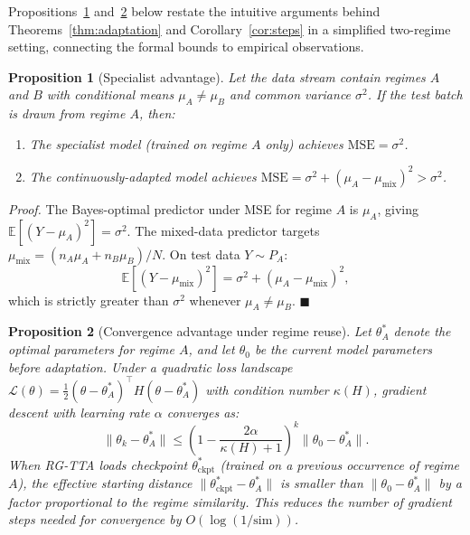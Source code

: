 \documentclass[journal]{IEEEtran}
\newtheorem{proposition}{Proposition}
\renewenvironment{proof}[1][Proof]{\noindent\textit{#1.}\space}{\hfill$\blacksquare$\par\medskip}
\begin{document}
Propositions~\ref{prop:specialist} and~\ref{prop:convergence} below restate the intuitive arguments behind Theorems~\ref{thm:adaptation} and Corollary~\ref{cor:steps} in a simplified two-regime setting, connecting the formal bounds to empirical observations.

\begin{proposition}[Specialist advantage]
\label{prop:specialist}
Let the data stream contain regimes $A$ and $B$ with conditional means $\mu_A \neq \mu_B$ and common variance $\sigma^2$. If the test batch is drawn from regime $A$, then:
\begin{enumerate}[nosep]
  \item The specialist model (trained on regime $A$ only) achieves $\text{MSE} = \sigma^2$.
  \item The continuously-adapted model achieves $\text{MSE} = \sigma^2 + (\mu_A - \mu_{\text{mix}})^2 > \sigma^2$.
\end{enumerate}
\end{proposition}

\begin{proof}
The Bayes-optimal predictor under MSE for regime $A$ is $\mu_A$, giving $\mathbb{E}[(Y - \mu_A)^2] = \sigma^2$. The mixed-data predictor targets $\mu_{\text{mix}} = (n_A \mu_A + n_B \mu_B) / N$. On test data $Y \sim P_A$:
\[
  \mathbb{E}[(Y - \mu_{\text{mix}})^2] = \sigma^2 + (\mu_A - \mu_{\text{mix}})^2,
\]
which is strictly greater than $\sigma^2$ whenever $\mu_A \neq \mu_B$.
\end{proof}

\begin{proposition}[Convergence advantage under regime reuse]
\label{prop:convergence}
Let $\theta^*_A$ denote the optimal parameters for regime $A$, and let $\theta_0$ be the current model parameters before adaptation. Under a quadratic loss landscape $\mathcal{L}(\theta) = \frac{1}{2}(\theta - \theta^*_A)^\top H (\theta - \theta^*_A)$ with condition number $\kappa(H)$, gradient descent with learning rate $\alpha$ converges as:
\[
  \|\theta_k - \theta^*_A\| \leq \left(1 - \frac{2\alpha}{\kappa(H) + 1}\right)^k \|\theta_0 - \theta^*_A\|.
\]
When RG-TTA loads checkpoint $\theta^*_{\text{ckpt}}$ (trained on a previous occurrence of regime $A$), the effective starting distance $\|\theta^*_{\text{ckpt}} - \theta^*_A\|$ is smaller than $\|\theta_0 - \theta^*_A\|$ by a factor proportional to the regime similarity. This reduces the number of gradient steps needed for convergence by $O(\log(1/\text{sim}))$.
\end{proposition}
\end{document}
